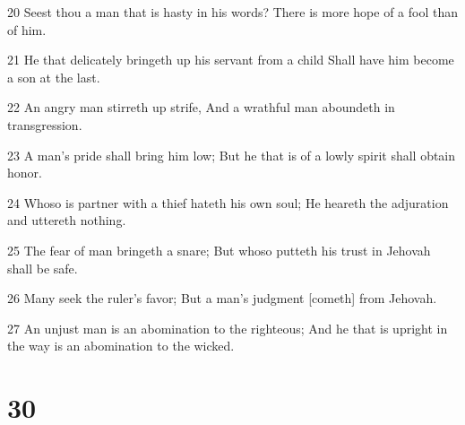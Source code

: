 \par 20 Seest thou a man that is hasty in his words? There is more hope of a fool than of him.
\par 21 He that delicately bringeth up his servant from a child Shall have him become a son at the last.
\par 22 An angry man stirreth up strife, And a wrathful man aboundeth in transgression.
\par 23 A man's pride shall bring him low; But he that is of a lowly spirit shall obtain honor.
\par 24 Whoso is partner with a thief hateth his own soul; He heareth the adjuration and uttereth nothing.
\par 25 The fear of man bringeth a snare; But whoso putteth his trust in Jehovah shall be safe.
\par 26 Many seek the ruler's favor; But a man's judgment [cometh] from Jehovah.
\par 27 An unjust man is an abomination to the righteous; And he that is upright in the way is an abomination to the wicked.

\chapter{30}

